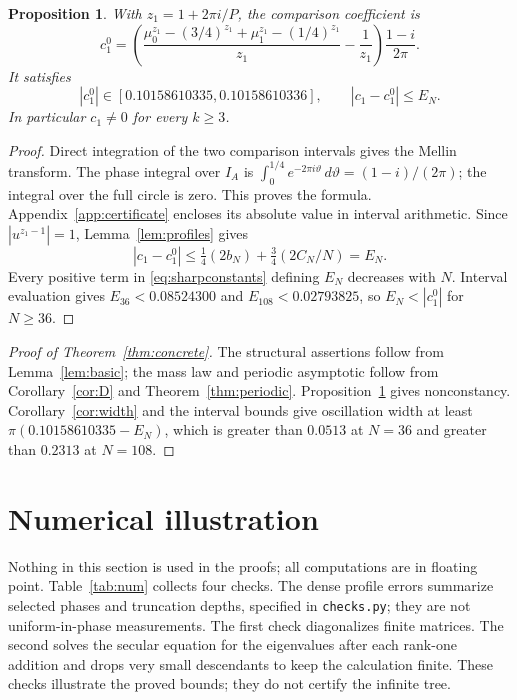 \documentclass[11pt]{article}
\newtheorem{proposition}[theorem]{Proposition}
\theoremstyle{definition}
\theoremstyle{remark}
\begin{document}
\begin{proposition}\label{prop:c1}
With $z_1=1+2\pi i/P$, the comparison coefficient is
\[
 c_1^0=\left(\frac{\mu_0^{z_1}-(3/4)^{z_1}
 +\mu_1^{z_1}-(1/4)^{z_1}}{z_1}-\frac1{z_1}\right)
 \frac{1-i}{2\pi}.
\]
It satisfies
\[
 |c_1^0|\in[0.10158610335,0.10158610336],\qquad
 |c_1-c_1^0|\le E_N.
\]
In particular $c_1\ne0$ for every $k\ge3$.
\end{proposition}
\begin{proof}
Direct integration of the two comparison intervals gives the Mellin
transform. The phase integral over $I_A$ is
$\int_0^{1/4}e^{-2\pi i\vartheta}\,d\vartheta=(1-i)/(2\pi)$; the
integral over the full circle is zero. This proves the formula.
Appendix~\ref{app:certificate} encloses its absolute value in interval
arithmetic. Since $|u^{z_1-1}|=1$, Lemma~\ref{lem:profiles} gives
\[
 |c_1-c_1^0|\le\tfrac14(2b_N)+\tfrac34(2C_N/N)=E_N.
\]
Every positive term in \eqref{eq:sharpconstants} defining $E_N$ decreases
with $N$. Interval evaluation gives $E_{36}<0.08524300$ and
$E_{108}<0.02793825$, so $E_N<|c_1^0|$ for $N\ge36$.
\end{proof}

\begin{proof}[Proof of Theorem~\ref{thm:concrete}]
The structural assertions follow from Lemma~\ref{lem:basic}; the mass
law and periodic asymptotic follow from Corollary~\ref{cor:D} and
Theorem~\ref{thm:periodic}. Proposition~\ref{prop:c1} gives nonconstancy.
Corollary~\ref{cor:width} and the interval bounds give oscillation width
at least $\pi(0.10158610335-E_N)$, which is greater than $0.0513$ at
$N=36$ and greater than $0.2313$ at $N=108$.
\end{proof}

\section{Numerical illustration}\label{sec:numerics}
Nothing in this section is used in the proofs; all computations are in
floating point. Table~\ref{tab:num} collects four checks. The dense
profile errors summarize selected phases and truncation depths, specified
in \texttt{checks.py}; they are not uniform-in-phase measurements.
The first check diagonalizes finite matrices. The second solves the
secular equation for the eigenvalues after each rank-one addition and
drops very small descendants to keep the calculation finite. These
checks illustrate the proved bounds; they do not certify the infinite
tree.
\end{document}

